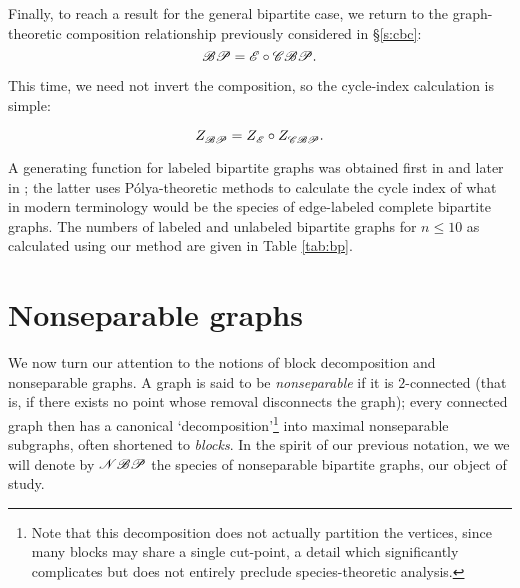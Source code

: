 \documentclass[distribution,draft]{brandiss} %
\numberwithin{section}{chapter}
\numberwithin{figure}{chapter}
\begin{document}
Finally, to reach a result for the general bipartite case, we return to the graph-theoretic composition relationship previously considered in \S \ref{s:cbc}:
\begin{equation*}
  \mathscr{BP} = \mathscr{E} \circ \mathscr{CBP}.
\end{equation*}

This time, we need not invert the composition, so the cycle-index calculation is simple:
\begin{theorem}
  \begin{equation}
     Z_{\mathscr{BP}}^{}  =  Z_{\mathscr{E}}^{}  \circ  Z_{\mathscr{CBP}}^{} .
  \end{equation}
\end{theorem}

A generating function for labeled bipartite graphs was obtained first in \cite{harprins:bipartite} and later in \cite{han:bipartite}; the latter uses P\'{o}lya-theoretic methods to calculate the cycle index of what in modern terminology would be the species of edge-labeled complete bipartite graphs.
The numbers of labeled and unlabeled bipartite graphs for $n \leq 10$ as calculated using our method are given in Table \ref{tab:bp}.

\section{Nonseparable graphs}\label{s:nbp}
We now turn our attention to the notions of block decomposition and nonseparable graphs.
A graph is said to be \emph{nonseparable} if it is $2$-connected (that is, if there exists no point whose removal disconnects the graph); every connected graph then has a canonical `decomposition'\footnote{Note that this decomposition does not actually partition the vertices, since many blocks may share a single cut-point, a detail which significantly complicates but does not entirely preclude species-theoretic analysis.} into maximal nonseparable subgraphs, often shortened to \emph{blocks}.
In the spirit of our previous notation, we we will denote by $\mathscr{NBP}$ the species of nonseparable bipartite graphs, our object of study.
\end{document}
